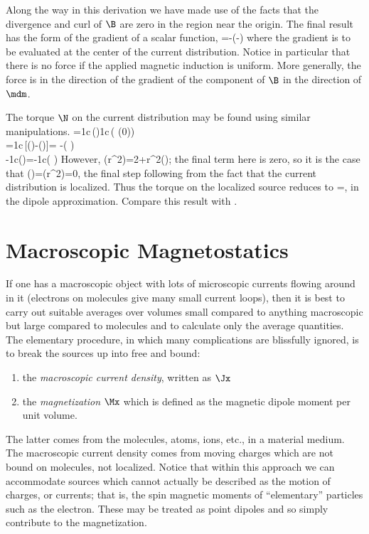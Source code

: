 {Along the way in this derivation we have made use of the facts that the
divergence and curl of $\B$ are zero in the region near the origin. The
final result has the form of the gradient of a scalar function,
\beq
\F=-\grad(-\mdm\cdot\Bx)
\eeq
where the gradient is to be evaluated at the center of the current
distribution. Notice in particular that there is no force if the applied
magnetic induction is uniform. More generally, the force is in the
direction of the gradient of the component of $\B$ in the direction of
$\mdm$.

The torque $\N$ on the current distribution may be found using similar
manipulations.
\beqa
\N=\frac1c\iniv\,\x\times(\Jx\times\Bx)\approx\frac1c\iniv\,\x\times(\Jx\times
\B(0))\nonumber\\
=\frac1c\iniv\,[(\x\cdot\B)\Jx-(\x\cdot\Jx)\B]=
-\iniv\B\times(\x\times\Jx
)\nonumber\\-\frac1c\B\iniv(\x\cdot\Jx)=\mdm\times\B-\frac1c\B\iniv(\x
\cdot\Jx)
\eeqa
However,
\beq
\div(r^2\Jx)=2\x\cdot\Jx+r^2(\div\Jx);
\eeq
the final term here is zero, so it is the case that
\beq
\iniv(\x\cdot\Jx)=\iniv\div(r^2\Jx)=0,
\eeq
the final step following from the fact that the current distribution is
localized. Thus the torque on the localized source reduces to
\beq
\N=\mdm\times\B,
\eeq
in the dipole approximation. Compare this result with .

\section{Macroscopic Magnetostatics}
If one has a macroscopic object with lots of microscopic currents flowing
around in it (electrons on molecules give many small current loops), then
it is best to carry out suitable averages over volumes small compared to
anything macroscopic but large compared to molecules and to calculate only
the average quantities. The elementary procedure, in which many
complications are blissfully ignored, is to break the sources up into
free and bound:
\begin{enumerate}
\item the {\em macroscopic current density}, written as $\Jx$
\item the
{\em magnetization} $\Mx$ which is defined as the magnetic dipole moment per
unit volume. 
\end{enumerate} 
The latter comes from the molecules, atoms, ions, etc., in a
material medium. The macroscopic current density comes from moving charges
which are not bound on molecules, \ie not localized. Notice that within
this approach we can accommodate sources which cannot actually be described
as the motion of charges, or currents; that is, the spin magnetic moments of
``elementary'' particles such as the electron. These may be treated as
point dipoles and so simply contribute to the magnetization.

}
